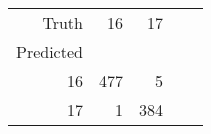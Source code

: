 \begin{tabular}{rrrrr}
\toprule
Truth & 16 & 17 \\
Predicted &  &  \\
\midrule
16 & 477 & 5 \\
17 & 1 & 384 \\
\bottomrule
\end{tabular}
